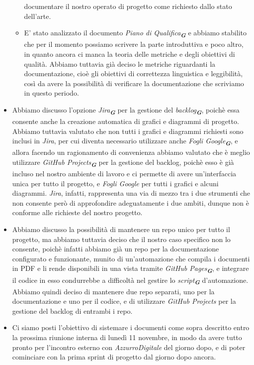 \begin{itemize}
\begin{itemize}
        documentare il nostro operato di progetto come richiesto dallo stato dell'arte.
        \item E' stato analizzato il documento \emph{Piano di Qualifica}\textsubscript{\textit{\textbf{G}}} e abbiamo stabilito che per il momento possiamo 
        scrivere la parte introduttiva e poco altro, in quanto ancora ci manca la teoria delle metriche e degli obiettivi di qualità. Abbiamo tuttavia già 
        deciso le metriche riguardanti la documentazione, cioè gli obiettivi di correttezza linguistica e leggibilità, così da avere la possibilità di 
        verificare la documentazione che scriviamo in questo periodo.
    \end{itemize}
    \item Abbiamo discusso l'opzione \emph{Jira}\textsubscript{\textit{\textbf{G}}} per la gestione del \emph{backlog}\textsubscript{\textit{\textbf{G}}}, 
    poichè essa consente anche la creazione automatica di grafici e diagrammi di progetto. Abbiamo tuttavia valutato che non tutti i grafici e diagrammi 
    richiesti sono inclusi in \emph{Jira}, per cui diventa necessario utilizzare anche \emph{Fogli Google}\textsubscript{\textit{\textbf{G}}}, e allora 
    facendo un ragionamento di convenienza abbiamo valutato che è meglio utilizzare \emph{GitHub Projects}\textsubscript{\textit{\textbf{G}}} per la gestione
    del backlog, poichè esso è già incluso nel nostro ambiente di lavoro e ci permette di avere un'interfaccia unica per tutto il progetto, e 
    \emph{Fogli Google} per tutti i grafici e alcuni diagrammi. \emph{Jira}, infatti, rappresenta una via di mezzo tra i due strumenti che non consente però
    di approfondire adeguatamente i due ambiti, dunque non è conforme alle richieste del nostro progetto.
    \item Abbiamo discusso la possibilità di mantenere un repo unico per tutto il progetto, ma abbiamo tuttavia deciso che il nostro caso specifico non lo
    consente, poichè infatti abbiamo già un repo per la documentazione configurato e funzionante, munito di un'automazione che compila i documenti in PDF
    e li rende disponibili in una vista tramite \emph{GitHub Pages}\textsubscript{\textit{\textbf{G}}}, e integrare il codice in esso condurrebbe a 
    difficoltà nel gestire lo \emph{script}\textsubscript{\textit{\textbf{G}}} d'automazione.
    Abbiamo quindi deciso di mantenere due repo separati, uno per la documentazione e uno per il codice, e di utilizzare \emph{GitHub Projects} per la
    gestione del backlog di entrambi i repo.
    \item Ci siamo posti l'obiettivo di sistemare i documenti come sopra descritto entro la prossima riunione interna di lunedì 11 novembre, 
    in modo da avere tutto pronto per l'incontro esterno con \emph{AzzurroDigitale} del giorno dopo, e di poter cominciare con la prima sprint 
    di progetto dal giorno dopo ancora.
\end{itemize}
